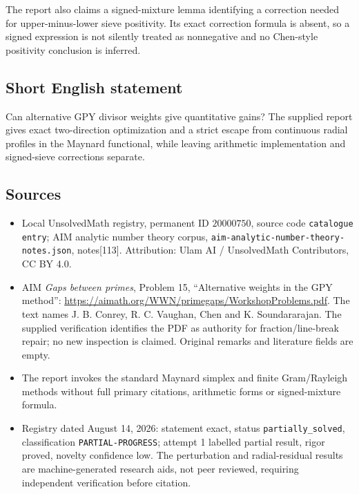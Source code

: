 \documentclass[11pt]{article}
\begin{document}
The report also claims a signed-mixture lemma identifying a correction needed for upper-minus-lower sieve positivity. Its exact correction formula is absent, so a signed expression is not silently treated as nonnegative and no Chen-style positivity conclusion is inferred.
\subsection{Short English statement}
Can alternative GPY divisor weights give quantitative gains? The supplied report gives exact two-direction optimization and a strict escape from continuous radial profiles in the Maynard functional, while leaving arithmetic implementation and signed-sieve corrections separate.
\subsection{Sources}
\begin{itemize}
\item Local UnsolvedMath registry, permanent ID \(20000750\), source code \texttt{catalogue entry}; AIM analytic number theory corpus, \texttt{aim-analytic-number-theory-notes.json}, notes[113]. Attribution: Ulam AI / UnsolvedMath Contributors, CC BY 4.0.
\item AIM \emph{Gaps between primes}, Problem 15, ``Alternative weights in the GPY method'': \url{https://aimath.org/WWN/primegaps/WorkshopProblems.pdf}. The text names J. B. Conrey, R. C. Vaughan, Chen and K. Soundararajan. The supplied verification identifies the PDF as authority for fraction/line-break repair; no new inspection is claimed. Original remarks and literature fields are empty.
\item The report invokes the standard Maynard simplex and finite Gram/Rayleigh methods without full primary citations, arithmetic forms or signed-mixture formula.
\item Registry dated August 14, 2026: statement exact, status \texttt{partially\_solved}, classification \texttt{PARTIAL-PROGRESS}; attempt 1 labelled partial result, rigor proved, novelty confidence low. The perturbation and radial-residual results are machine-generated research aids, not peer reviewed, requiring independent verification before citation.
\end{itemize}
\end{document}
